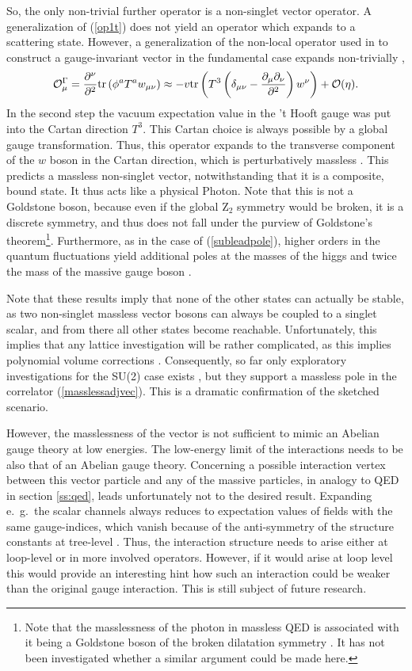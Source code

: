 \documentclass[final,12pt]{article}
\newcommand*{\no}{\noindent}
\newcommand*{\be}{\begin{equation}}
\newcommand*{\ee}{\end{equation}}
\newcommand*{\pd}{\partial}
\newcommand*{\pdm}{\pd_{\mu}}
\newcommand*{\pdn}{\pd_{\nu}}
\newcommand*{\pref}[1]{(\ref{#1})}
\newcommand*{\mn}{{\mu\nu}}
\newcommand*{\tr}{\mathrm{tr}}
\newcommand*{\1}{1\!\!\!\bot}
\newcommand*{\op}{{\cal O}}
\begin{document}
So, the only non-trivial further operator is a non-singlet vector operator. A generalization of \pref{op1t} does not yield an operator which expands to a scattering state. However, a generalization of the non-local operator used in \cite{Frohlich:1981yi} to construct a gauge-invariant vector in the fundamental case expands non-trivially \cite{Maas:2017xzh},
\be
\op^\Gamma_\mu=\frac{\pd^\nu}{\pd^2}\tr\left(\phi^a T^aw_\mn\right)\approx-v\tr\left(T^3\left(\delta_\mn-\frac{\pdm\pdn}{\pd^2}\right)w^\nu\right)+\op(\eta)\label{masslessadjvec}.
\ee
\no In the second step the vacuum expectation value in the 't Hooft gauge was put into the Cartan direction $T^3$. This Cartan choice is always possible by a global gauge transformation. Thus, this operator expands to the transverse component of the $w$ boson in the Cartan direction, which is perturbatively massless \cite{Maas:2017xzh,O'Raifeartaigh:1986vq}. This predicts a massless non-singlet vector, notwithstanding that it is a composite, bound state. It thus acts like a physical Photon. Note that this is not a Goldstone boson, because even if the global Z$_2$ symmetry would be broken, it is a discrete symmetry, and thus does not fall under the purview of Goldstone's theorem\footnote{Note that the masslessness of the photon in massless QED is associated with it being a Goldstone boson of the broken dilatation symmetry \cite{Alkofer:2000wg,Lenz:1994tc}. It has not been investigated whether a similar argument could be made here.}. Furthermore, as in the case of \pref{subleadpole}, higher orders in the quantum fluctuations yield additional poles at the masses of the higgs and twice the mass of the massive gauge boson \cite{Maas:2017xzh}.

Note that these results imply that none of the other states can actually be stable, as two non-singlet massless vector bosons can always be coupled to a singlet scalar, and from there all other states become reachable. Unfortunately, this implies that any lattice investigation will be rather complicated, as this implies polynomial volume corrections \cite{Gattringer:2010zz,Luscher:1985dn}. Consequently, so far only exploratory investigations for the SU(2) case exists \cite{Lee:1985yi}, but they support a massless pole in the correlator \pref{masslessadjvec}. This is a dramatic confirmation of the sketched scenario.

However, the masslessness of the vector is not sufficient to mimic an Abelian gauge theory at low energies. The low-energy limit of the interactions needs to be also that of an Abelian gauge theory. Concerning a possible interaction vertex between this vector particle and any of the massive particles, in analogy to QED in section \ref{ss:qed}, leads unfortunately not to the desired result. Expanding e.\ g.\ the scalar channels always reduces to expectation values of fields with the same gauge-indices, which vanish because of the anti-symmetry of the structure constants at tree-level \cite{Sondenheimer:pc}. Thus, the interaction structure needs to arise either at loop-level or in more involved operators. However, if it would arise at loop level this would provide an interesting hint how such an interaction could be weaker than the original gauge interaction. This is still subject of future research.
\end{document}
